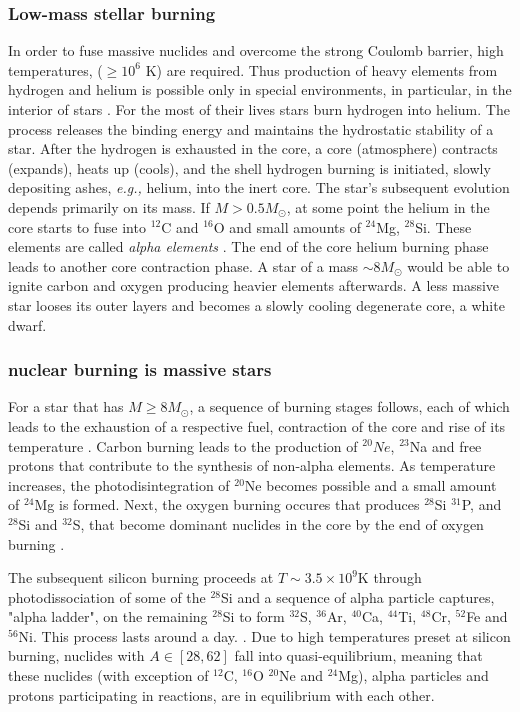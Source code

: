 \documentclass[11pt,a4paper,headinclude=true,DIV=14,BCOR=8mm,chapterprefix,listof=totoc,twoside,openright,abstracton]{scrbook}
\begin{document}

\subsubsection{Low-mass stellar burning}

In order to fuse massive nuclides and overcome the strong Coulomb barrier, high temperatures, ($\geq 10^6$ K) are required. Thus production of heavy elements from hydrogen and helium is possible only in special environments, in particular, in the interior of stars \cite{Bethe:1939}. 
For the most of their lives stars burn hydrogen into helium. The process releases the binding energy and maintains the hydrostatic stability of a star. After the hydrogen is exhausted in the core, a core (atmosphere) contracts (expands), heats up (cools), and the shell hydrogen burning is initiated, slowly depositing ashes, \textit{e.g.,} helium, into the inert core. 
The star's subsequent evolution depends primarily on its mass. If $M>0.5M_{\odot}$, at some point the helium in the core starts to fuse into $^{12}$C and $^{16}$O and small amounts of $^{24}$Mg, $^{28}$Si. These elements are called \textit{alpha elements}  \cite{Rolfs:1988,Hasen:2004}. 
The end of the core helium burning phase leads to another core contraction phase. A star of a mass $\sim 8M_{\odot}$ would be able to ignite carbon and oxygen producing heavier elements afterwards. A less massive star looses its outer layers and becomes a slowly cooling degenerate core, a white dwarf.


\subsubsection{nuclear burning is massive stars}

For a star that has $M\geq 8M_{\odot}$, a sequence of burning stages follows, each of which leads to the exhaustion of a respective fuel, contraction of the core and rise of its temperature \cite{Woosley:2002}. Carbon burning leads to the production of $^{20}Ne$, $^{23}$Na and free protons that contribute to the synthesis of non-alpha elements. As temperature increases, the photodisintegration of $^{20}$Ne becomes possible and a small amount of $^{24}$Mg is formed. Next, the oxygen burning occures that produces $^{28}$Si $^{31}$P, and $^{28}$Si and $^{32}$S, that become dominant nuclides in the core by the end of oxygen burning \cite{Rolfs:1988}.

The subsequent silicon burning proceeds at $T\sim3.5\times10^9$K through photodissociation of some of the $^{28}$Si and a sequence of alpha particle captures, "alpha ladder", on the remaining $^{28}$Si to form $^{32}$S, $^{36}$Ar, $^{40}$Ca, $^{44}$Ti, $^{48}$Cr, $^{52}$Fe and $^{56}$Ni. This process lasts around a day. \cite{Rolfs:1988,Hasen:2004}. Due to high temperatures preset at silicon burning, nuclides with $A\in[28, 62]$ fall into quasi-equilibrium, meaning that these nuclides (with exception of $^{12}$C, $^{16}$O $^{20}$Ne and $^{24}$Mg), alpha particles and protons participating in reactions, are in equilibrium with each other. 
\end{document}
